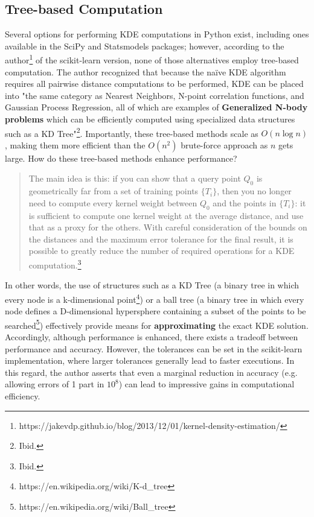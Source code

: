 \documentclass[11pt]{article}
\begin{document}
\subsection{Tree-based Computation}

Several options for performing KDE computations in Python exist, including ones available in the SciPy and Statsmodels packages; however, according to the author\footnote{https://jakevdp.github.io/blog/2013/12/01/kernel-density-estimation/} of the scikit-learn version, none of those alternatives employ tree-based computation. The author recognized that because the na\"ive KDE algorithm requires all pairwise distance computations to be performed, KDE can be placed into "the same category as Nearest Neighbors, N-point correlation functions, and Gaussian Process Regression, all of which are examples of \textbf{Generalized N-body problems} which can be efficiently computed using specialized data structures such as a KD Tree"\footnote{Ibid.}. Importantly, these tree-based methods scale as $O(n \log n)$, making them more efficient than the $O(n^2)$ brute-force approach as $n$ gets large. How do these tree-based methods enhance performance?

\begin{quote}
The main idea is this: if you can show that a query point $Q_0$ is geometrically far from a set of training points $\{T_i\}$, then you no longer need to compute every kernel weight between $Q_0$ and the points in $\{T_i\}$: it is sufficient to compute one kernel weight at the average distance, and use that as a proxy for the others. With careful consideration of the bounds on the distances and the maximum error tolerance for the final result, it is possible to greatly reduce the number of required operations for a KDE computation.\footnote{Ibid.}
\end{quote}
 
\noindent In other words, the use of structures such as a KD Tree (a binary tree in which every node is a k-dimensional point\footnote{https://en.wikipedia.org/wiki/K-d\_tree}) or a ball tree (a binary tree in which every node defines a D-dimensional hypersphere containing a subset of the points to be searched\footnote{https://en.wikipedia.org/wiki/Ball\_tree}) effectively provide means for \textbf{approximating} the exact KDE solution. Accordingly, although performance is enhanced, there exists a tradeoff between performance and accuracy. However, the tolerances can be set in the scikit-learn implementation, where larger tolerances generally lead to faster executions. In this regard, the author asserts that even a marginal reduction in accuracy (e.g. allowing errors of 1 part in $10^8$) can lead to impressive gains in computational efficiency.



\end{document}
